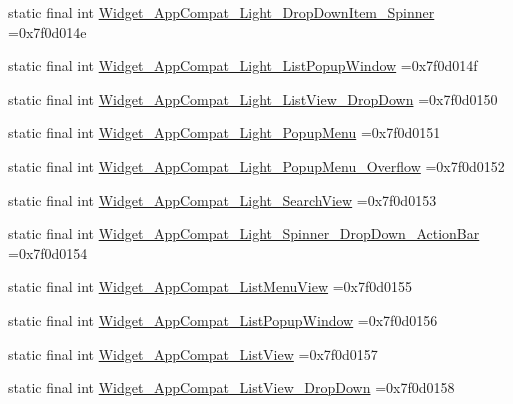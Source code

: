 \begin{DoxyCompactItemize}
\item 
static final int \mbox{\hyperlink{classcom_1_1example_1_1trainawearapplication_1_1_r_1_1style_ab0a862e03ffebdd8b49f37cf24834f9d}{Widget\+\_\+\+App\+Compat\+\_\+\+Light\+\_\+\+Drop\+Down\+Item\+\_\+\+Spinner}} =0x7f0d014e
\item 
static final int \mbox{\hyperlink{classcom_1_1example_1_1trainawearapplication_1_1_r_1_1style_a0823a212623b14a95c66b6bc8d144940}{Widget\+\_\+\+App\+Compat\+\_\+\+Light\+\_\+\+List\+Popup\+Window}} =0x7f0d014f
\item 
static final int \mbox{\hyperlink{classcom_1_1example_1_1trainawearapplication_1_1_r_1_1style_ae7b110e43a611132ad098e2118536433}{Widget\+\_\+\+App\+Compat\+\_\+\+Light\+\_\+\+List\+View\+\_\+\+Drop\+Down}} =0x7f0d0150
\item 
static final int \mbox{\hyperlink{classcom_1_1example_1_1trainawearapplication_1_1_r_1_1style_a857f3ccee913ce95c382af2f947adc25}{Widget\+\_\+\+App\+Compat\+\_\+\+Light\+\_\+\+Popup\+Menu}} =0x7f0d0151
\item 
static final int \mbox{\hyperlink{classcom_1_1example_1_1trainawearapplication_1_1_r_1_1style_a1d1e58049cfc4937f0f1fd72684fc4ae}{Widget\+\_\+\+App\+Compat\+\_\+\+Light\+\_\+\+Popup\+Menu\+\_\+\+Overflow}} =0x7f0d0152
\item 
static final int \mbox{\hyperlink{classcom_1_1example_1_1trainawearapplication_1_1_r_1_1style_a3f9e5c099147eb5d358d08e5a3933649}{Widget\+\_\+\+App\+Compat\+\_\+\+Light\+\_\+\+Search\+View}} =0x7f0d0153
\item 
static final int \mbox{\hyperlink{classcom_1_1example_1_1trainawearapplication_1_1_r_1_1style_a62e1ca31027eee63701406a2dd48b15d}{Widget\+\_\+\+App\+Compat\+\_\+\+Light\+\_\+\+Spinner\+\_\+\+Drop\+Down\+\_\+\+Action\+Bar}} =0x7f0d0154
\item 
static final int \mbox{\hyperlink{classcom_1_1example_1_1trainawearapplication_1_1_r_1_1style_a30d613a55a1e2c795b3fa8b96a4158af}{Widget\+\_\+\+App\+Compat\+\_\+\+List\+Menu\+View}} =0x7f0d0155
\item 
static final int \mbox{\hyperlink{classcom_1_1example_1_1trainawearapplication_1_1_r_1_1style_a847a68ccfae693f3721dd02012276ebb}{Widget\+\_\+\+App\+Compat\+\_\+\+List\+Popup\+Window}} =0x7f0d0156
\item 
static final int \mbox{\hyperlink{classcom_1_1example_1_1trainawearapplication_1_1_r_1_1style_aa65f78891f54ccb274f7dac3eb544fa5}{Widget\+\_\+\+App\+Compat\+\_\+\+List\+View}} =0x7f0d0157
\item 
static final int \mbox{\hyperlink{classcom_1_1example_1_1trainawearapplication_1_1_r_1_1style_ad5e87a56d1f494fa96a601836d03a5ae}{Widget\+\_\+\+App\+Compat\+\_\+\+List\+View\+\_\+\+Drop\+Down}} =0x7f0d0158

\end{DoxyCompactItemize}
